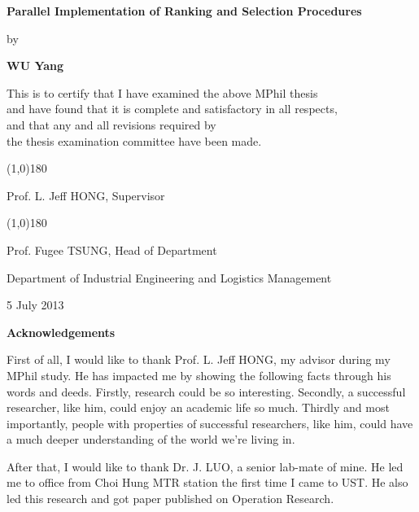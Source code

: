 \documentclass[12pt,a4paper]{report}
\begin{document}
\newpage

\null\vspace{1.0cm}
\begin{center}
{\Large\bf Parallel Implementation of Ranking and Selection Procedures}
\vspace{1.5cm}

{\large by}\smallskip

{\large\bf WU Yang}\normalsize

\vspace{1cm}

This is to certify that I have examined the above MPhil thesis \\
and have found that it is complete and satisfactory in all respects, \\
and that any and all revisions required by \\
the thesis examination committee have been made.

\vspace{2.0cm}

\line(1,0){180} \smallskip

Prof. L. Jeff HONG, Supervisor
\vspace{1.5cm}

\line(1,0){180} \smallskip

Prof. Fugee TSUNG, Head of Department
\medskip

Department of Industrial Engineering and Logistics Management\medskip

5 July 2013
\end{center}

\newpage

\begin{center}{\Large\bf Acknowledgements}\normalsize
\end{center}
\vspace{0.5cm}

First of all, I would like to thank Prof. L. Jeff HONG, my advisor during my MPhil study. He has impacted me by showing the following facts through his words and deeds. Firstly, research could be so interesting. Secondly, a successful researcher, like him, could enjoy an academic life so much. Thirdly and most importantly, people with properties of successful researchers, like him, could have a much deeper understanding of the world we're living in.

After that, I would like to thank Dr. J. LUO, a senior lab-mate of mine. He led me to office from Choi Hung MTR station the first time I came to UST. He also led this research and got paper published on Operation Research.
\end{document}
